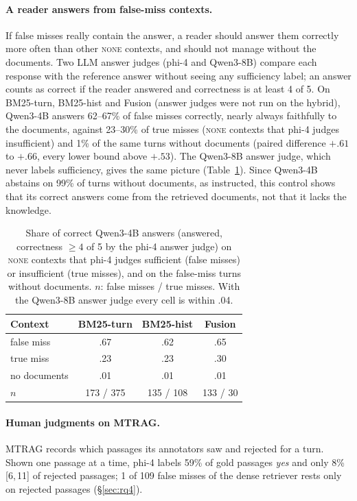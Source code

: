 \documentclass[11pt]{article}
\newcommand{\ci}[2]{\,{\scriptsize[#1,\,#2]}}
\newcommand{\qnone}{\textnormal{\textsc{none}}}
\newcommand{\cyes}{\textit{yes}}
\begin{document}
\paragraph{A reader answers from false-miss contexts.}
If false misses really contain the answer, a reader should answer them correctly more often than other \qnone{} contexts, and should not manage without the documents. Two LLM answer judges (phi-4 and Qwen3-8B) compare each response with the reference answer without seeing any sufficiency label; an answer counts as correct if the reader answered and correctness is at least 4 of 5. On BM25-turn, BM25-hist and Fusion (answer judges were not run on the hybrid), Qwen3-4B answers 62--67\% of false misses correctly, nearly always faithfully to the documents, against 23--30\% of true misses (\qnone{} contexts that phi-4 judges insufficient) and 1\% of the same turns without documents (paired difference $+.61$ to $+.66$, every lower bound above $+.53$). The Qwen3-8B answer judge, which never labels sufficiency, gives the same picture (Table~\ref{tab:leak}). Since Qwen3-4B abstains on 99\% of turns without documents, as instructed, this control shows that its correct answers come from the retrieved documents, not that it lacks the knowledge.

\begin{table}[t]
\centering\small
\caption{Share of correct Qwen3-4B answers (answered, correctness $\geq4$ of 5 by the phi-4 answer judge) on \qnone{} contexts that phi-4 judges sufficient (false misses) or insufficient (true misses), and on the false-miss turns without documents. $n$: false misses / true misses. With the Qwen3-8B answer judge every cell is within .04.}
\label{tab:leak}
\setlength{\tabcolsep}{5pt}
\begin{tabular}{@{}lccc@{}}
\toprule
Context & BM25-turn & BM25-hist & Fusion \\
\midrule
false miss & .67 & .62 & .65 \\
true miss & .23 & .23 & .30 \\
no documents & .01 & .01 & .01 \\
\addlinespace[2pt]
$n$ & 173 / 375 & 135 / 108 & 133 / 30 \\
\bottomrule
\end{tabular}
\end{table}

\paragraph{Human judgments on MTRAG.}
MTRAG records which passages its annotators saw and rejected for a turn. Shown one passage at a time, phi-4 labels 59\% of gold passages \cyes{} and only 8\%\ci{6}{11} of rejected passages; 1 of 109 false misses of the dense retriever rests only on rejected passages (\S\ref{sec:rq4}).
\end{document}
